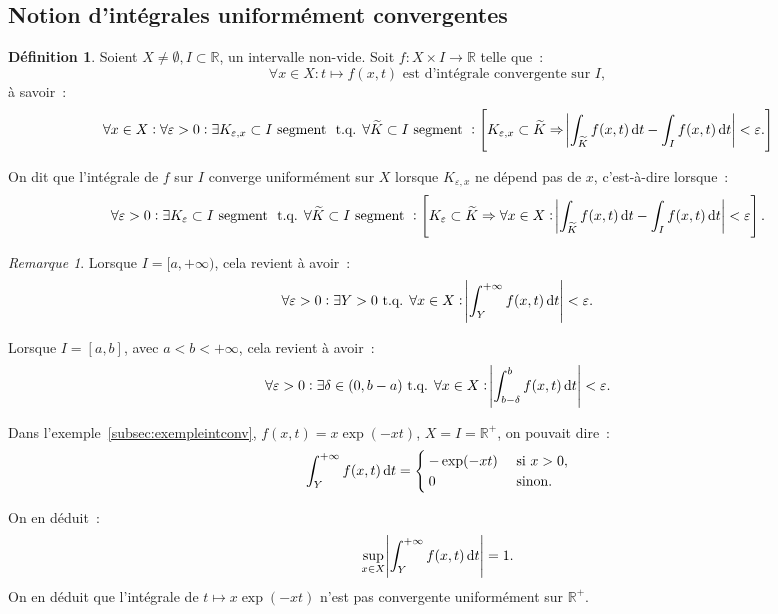 \documentclass{report}
\theoremstyle{definition}
\newtheorem{déf}[thm]{Définition}
\theoremstyle{remark}
\newtheorem*{rmq}{Remarque}
\numberwithin{equation}{section}
\newcommand{\R}{\mathbb R}
\newcommand{\Rp}{\R^{+}}
\newcommand{\tq}{\text{ t.q. }}
\newcommand{\pinfty}{{+\infty}}
\begin{document}
		\subsection{Notion d'intégrales uniformément convergentes}
			\begin{déf} Soient $X \neq \emptyset, I \subset \R$, un intervalle non-vide. Soit $f : X \times I \to \R$ telle que~:
			\begin{equation}
				\forall x \in X : t \mapsto f(x, t) \text{ est d'intégrale convergente sur } I,
			\end{equation}
			à savoir~:
			\begin{equation}
				\forall x \in X : \forall \varepsilon > 0 : \exists K_{\varepsilon, x} \subset I \text{ segment } \tq
				\forall \widetilde K \subset I \text{ segment } :
					\left[K_{\varepsilon, x} \subset \widetilde K \Rightarrow \abs {\int_{\widetilde K}f(x, t)\dif t - \int_If(x, t)\dif t} < \varepsilon.\right]
			\end{equation}

			On dit que l'intégrale de $f$ sur $I$ converge uniformément sur $X$ lorsque $K_{\varepsilon, x}$ ne dépend pas de $x$, c'est-à-dire lorsque~:
			\begin{equation}
				\forall \varepsilon > 0 : \exists K_\varepsilon \subset I \text{ segment } \tq \forall \widetilde K \subset I \text{ segment } :
				\left[K_\varepsilon \subset \widetilde K \Rightarrow
					\forall x \in X : \abs {\int_{\widetilde K}f(x, t)\dif t - \int_I f(x, t)\dif t} < \varepsilon\right].
			\end{equation}
			\end{déf}

			\begin{rmq} Lorsque $I = [a, \pinfty)$, cela revient à avoir~:
			\begin{equation}
				\forall \varepsilon > 0 : \exists Y > 0 \tq \forall x \in X : \abs {\int_Y^\pinfty f(x, t)\dif t} < \varepsilon.
			\end{equation}

			Lorsque $I = [a, b]$, avec $a < b < \pinfty$, cela revient à avoir~:
			\begin{equation}
				\forall \varepsilon > 0 : \exists \delta \in (0, b-a) \tq \forall x \in X : \abs {\int_{b-\delta}^bf(x, t)\dif t} < \varepsilon.
			\end{equation}

			Dans l'exemple~\ref{subsec:exempleintconv}, $f(x, t) = x\exp(-xt)$, $X = I = \Rp$, on pouvait dire~:
			\begin{equation}
				\int_Y^\pinfty f(x, t)\dif t = \begin{cases}-\exp(-xt) &\text{ si } x > 0, \\0 &\text{ sinon}.\end{cases}
			\end{equation}

			On en déduit~:
			\begin{equation}
				\sup_{x \in X}\abs {\int_Y^\pinfty f(x, t)\dif t} = 1.
			\end{equation}
			On en déduit que l'intégrale de $t \mapsto x\exp(-xt)$ n'est pas convergente uniformément sur $\Rp$.
			\end{rmq}
\end{document}
